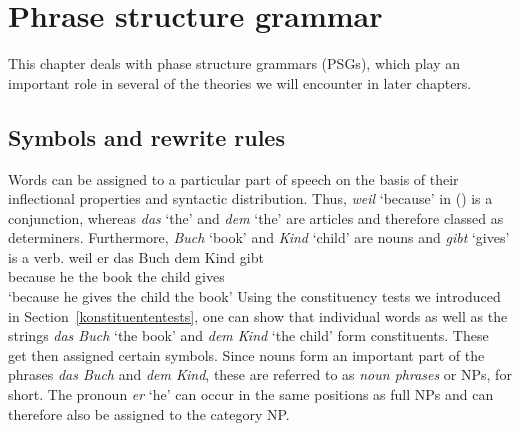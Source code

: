 
\chapter{Phrase structure grammar}
\label{Kapitel-PSG}

This chapter deals with phase structure grammars (PSGs), which play an important role in several of the theories we will encounter in later chapters.

\section{Symbols and rewrite rules}
\label{sec-simple-psg}

Words can be assigned to a particular part of speech on the basis of their inflectional properties
and syntactic distribution. Thus, \emph{weil} `because' in ()
is a conjunction, whereas \emph{das} `the' and \emph{dem} `the' are
articles and therefore classed as determiners. Furthermore, \emph{Buch} `book' and \emph{Kind} `child' are nouns 
and \emph{gibt} `gives' is a verb.
\ea\label{bsp-weil-er-das-buch-dem-Kind-gibt}
\gll weil er das Buch dem Kind gibt\\
	 because he the book the child gives\\
\glt `because he gives the child the book'
\z
Using the constituency tests we introduced in Section~\ref{konstituententests}, one can show that
individual words as well as the strings \emph{das Buch} `the book' and \emph{dem Kind} `the child'
form constituents. These get then assigned certain symbols. Since nouns form an important part of
the phrases \emph{das Buch} and \emph{dem Kind}, these are referred to as \emph{noun phrases} or
NPs, for short. The pronoun \emph{er} `he' can occur in the same positions as full NPs and can
therefore also be assigned to the category NP.

